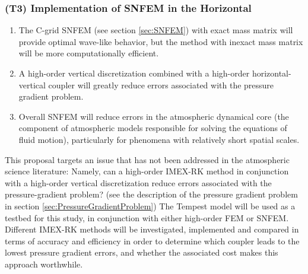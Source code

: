 \documentclass[11pt]{article}
\begin{document}


\subsubsection{(T3) Implementation of SNFEM in the Horizontal} \label{sec:HorizontalSNFEM}

\begin{enumerate}
\item The C-grid SNFEM (see section \ref{sec:SNFEM}) with exact mass matrix will provide optimal wave-like behavior, but the method with inexact mass matrix will be more computationally efficient.

\item A high-order vertical discretization combined with a high-order horizontal-vertical coupler will greatly reduce errors associated with the pressure gradient problem.

\item Overall SNFEM will reduce errors in the atmospheric dynamical core (the component of atmospheric models responsible for solving the equations of fluid motion), particularly for phenomena with relatively short spatial scales.
\end{enumerate}
\vspace{-0.4cm}


This proposal targets an issue that has not been addressed in the atmospheric science literature:  Namely, can a high-order IMEX-RK method in conjunction with a high-order vertical discretization reduce errors associated with the pressure-gradient problem? (see the description of the pressure gradient problem in section \ref{sec:PressureGradientProblem})  The Tempest model will be used as a testbed for this study, in conjunction with either high-order FEM or SNFEM.  Different IMEX-RK methods will be investigated, implemented and compared in terms of accuracy and efficiency in order to determine which coupler leads to the lowest pressure gradient errors, and whether the associated cost makes this approach worthwhile.
\end{document}

